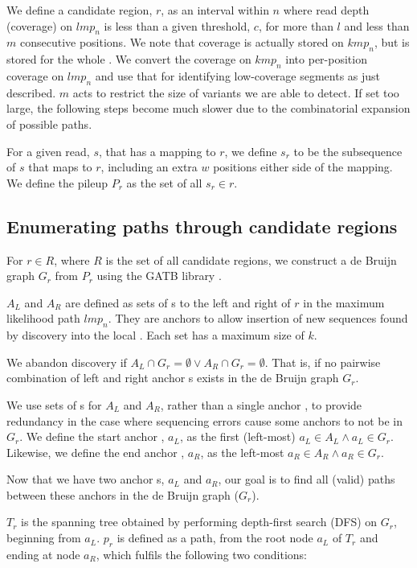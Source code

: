 We define a candidate region, $r$, as an interval within $n$ where read depth (coverage) on $lmp_n$ is less than a given threshold, $c$, for more than $l$ and less than $m$ consecutive positions. We note that coverage is actually stored on $kmp_n$, but is stored for the whole \kmer{}. We convert the coverage on $kmp_n$ into per-position coverage on $lmp_n$ and use that for identifying low-coverage segments as just described. $m$ acts to restrict the size of variants we are able to detect. If set too large, the following steps become much slower due to the combinatorial expansion of possible paths. 

For a given read, $s$, that has a mapping to $r$, we define $s_r$ to be the subsequence of $s$ that maps to $r$, including an extra $w$ positions either side of the mapping. We define the pileup $P_r$ as the set of all $s_r \in r$.

\subsection{Enumerating paths through candidate regions}
\label{sec:path-enum}

For $r \in R$, where $R$ is the set of all candidate regions, we construct a de Bruijn graph $G_r$ from $P_r$ using the GATB library \cite{gatb2014}. 

$A_L$ and $A_R$ are defined as sets of \kmer{}s to the left and right of $r$ in the maximum likelihood path $lmp_n$. They are anchors to allow insertion of new sequences found by \denovo{} discovery into the local \prg{}. Each set has a maximum size of $k$.

We abandon \denovo{} discovery if $A_L \cap G_r = \emptyset \lor A_R \cap G_r = \emptyset$. That is, if no pairwise combination of left and right anchor \kmer{}s exists in the de Bruijn graph $G_r$.

We use sets of \kmer{}s for $A_L$ and $A_R$, rather than a single anchor \kmer{}, to provide redundancy in the case where sequencing errors cause some anchors to not be in $G_r$. We define the start anchor \kmer{}, $a_L$, as the first (left-most) $a_L \in A_L \land a_L \in G_r$. Likewise, we define the end anchor \kmer{}, $a_R$, as the left-most $a_R \in A_R \land a_R \in G_r$.

Now that we have two anchor \kmer{}s, $a_L$ and $a_R$, our goal is to find all (valid) paths between these anchors in the de Bruijn graph ($G_r$).

$T_r$ is the spanning tree obtained by performing depth-first search (DFS) on $G_r$, beginning from $a_L$. $p_r$ is defined as a path, from the root node $a_L$ of $T_r$ and ending at node $a_R$, which fulfils the following two conditions:

